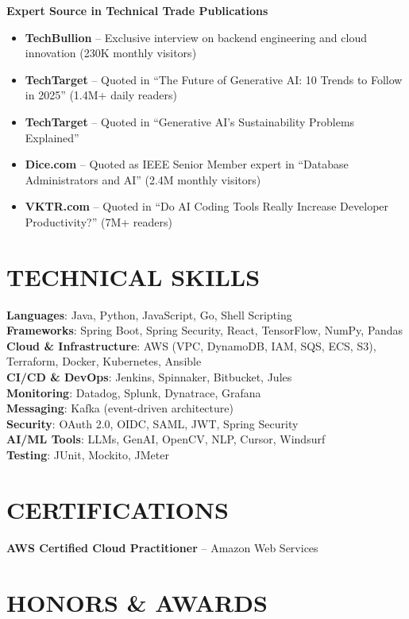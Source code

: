 \documentclass[11pt]{article}
\begin{document}
\textbf{Expert Source in Technical Trade Publications}
\begin{itemize}
    \item \textbf{TechBullion} -- Exclusive interview on backend engineering and cloud innovation (230K monthly visitors)
    \item \textbf{TechTarget} -- Quoted in ``The Future of Generative AI: 10 Trends to Follow in 2025'' (1.4M+ daily readers)
    \item \textbf{TechTarget} -- Quoted in ``Generative AI's Sustainability Problems Explained''
    \item \textbf{Dice.com} -- Quoted as IEEE Senior Member expert in ``Database Administrators and AI'' (2.4M monthly visitors)
    \item \textbf{VKTR.com} -- Quoted in ``Do AI Coding Tools Really Increase Developer Productivity?'' (7M+ readers)
\end{itemize}

\section*{TECHNICAL SKILLS}

\textbf{Languages}: Java, Python, JavaScript, Go, Shell Scripting\\
\textbf{Frameworks}: Spring Boot, Spring Security, React, TensorFlow, NumPy, Pandas\\
\textbf{Cloud \& Infrastructure}: AWS (VPC, DynamoDB, IAM, SQS, ECS, S3), Terraform, Docker, Kubernetes, Ansible\\
\textbf{CI/CD \& DevOps}: Jenkins, Spinnaker, Bitbucket, Jules\\
\textbf{Monitoring}: Datadog, Splunk, Dynatrace, Grafana\\
\textbf{Messaging}: Kafka (event-driven architecture)\\
\textbf{Security}: OAuth 2.0, OIDC, SAML, JWT, Spring Security\\
\textbf{AI/ML Tools}: LLMs, GenAI, OpenCV, NLP, Cursor, Windsurf\\
\textbf{Testing}: JUnit, Mockito, JMeter

\section*{CERTIFICATIONS}

\textbf{AWS Certified Cloud Practitioner} -- Amazon Web Services

\section*{HONORS \& AWARDS}
\end{document}
